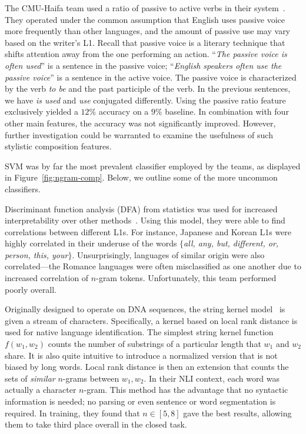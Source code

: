 The CMU-Haifa team used a ratio of passive to active verbs in their
system~\cite{nli-passives}. They operated under the common assumption that
English uses passive voice more frequently than other languages, and the amount
of passive use may vary based on the writer's L1. Recall that passive voice is a
literary technique that shifts attention away from the one performing an action.
``\emph{The passive voice is often used}'' is a sentence in the passive voice;
``\emph{English speakers often use the passive voice}'' is a sentence in the
active voice. The passive voice is characterized by the verb \emph{to be} and
the past participle of the verb. In the previous sentences, we have \emph{is
used} and \emph{use} conjugated differently. Using the passive ratio feature
exclusively yielded a $12\%$ accuracy on a $9\%$ baseline. In combination with
four other main features, the accuracy was not significantly improved. However,
further investigation could be warranted to examine the usefulness of such
stylistic composition features.

SVM was by far the most prevalent classifier employed by the teams, as displayed
in Figure~\ref{fig:ngram-comp}. Below, we outline some of the more uncommon
classifiers.

Discriminant function analysis (DFA) from statistics was used
for increased interpretability over other methods~\cite{nli-dfa}. Using this model, they were
able to find correlations between different L1s. For instance, Japanese and
Korean L1s were highly correlated in their underuse of the words $\{$\emph{all,
any, but, different, or, person, this, your}$\}$. Unsurprisingly, languages of
similar origin were also correlated---the Romance languages were often
misclassified as one another due to increased correlation of $n$-gram tokens.
Unfortunately, this team performed poorly overall.

Originally designed to operate on DNA sequences, the string kernel model~\cite{2013-stringkernel} is given a stream of characters. Specifically,
a kernel based on local rank distance is used for native language
identification. The simplest string kernel function $f(w_1,w_2)$ counts the
number of substrings of a particular length that $w_1$ and $w_2$ share. It is
also quite intuitive to introduce a normalized version that is not biased by
long words. Local rank distance is then an extension that counts the sets of
\emph{similar} $n$-grams between $w_1,w_2$. In their NLI context, each word was
actually a character $n$-gram. This method has the advantage that no syntactic
information is needed; no parsing or even sentence or word segmentation is
required. In training, they found that $n\in[5,8]$ gave the best results,
allowing them to take third place overall in the closed task.


